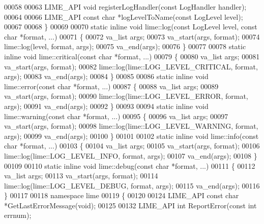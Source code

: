 \begin{DoxyCode}
00058 
00063 LIME_API \textcolor{keywordtype}{void} registerLogHandler(\textcolor{keyword}{const} LogHandler handler);
00064 
00066 LIME_API \textcolor{keyword}{const} \textcolor{keywordtype}{char} *logLevelToName(\textcolor{keyword}{const} LogLevel level);
00067 
00068 \}
00069 
00070 \textcolor{keyword}{static} \textcolor{keyword}{inline} \textcolor{keywordtype}{void} lime::log(\textcolor{keyword}{const} LogLevel level, \textcolor{keyword}{const} \textcolor{keywordtype}{char} *format, ...)
00071 \{
00072     va\_list args;
00073     va\_start(args, format);
00074     lime::log(level, format, args);
00075     va\_end(args);
00076 \}
00077 
00078 \textcolor{keyword}{static} \textcolor{keyword}{inline} \textcolor{keywordtype}{void} lime::critical(\textcolor{keyword}{const} \textcolor{keywordtype}{char} *format, ...)
00079 \{
00080     va\_list args;
00081     va\_start(args, format);
00082     lime::log(lime::LOG_LEVEL_CRITICAL, format, args);
00083     va\_end(args);
00084 \}
00085 
00086 \textcolor{keyword}{static} \textcolor{keyword}{inline} \textcolor{keywordtype}{void} lime::error(\textcolor{keyword}{const} \textcolor{keywordtype}{char} *format, ...)
00087 \{
00088     va\_list args;
00089     va\_start(args, format);
00090     lime::log(lime::LOG_LEVEL_ERROR, format, args);
00091     va\_end(args);
00092 \}
00093 
00094 \textcolor{keyword}{static} \textcolor{keyword}{inline} \textcolor{keywordtype}{void} lime::warning(\textcolor{keyword}{const} \textcolor{keywordtype}{char} *format, ...)
00095 \{
00096     va\_list args;
00097     va\_start(args, format);
00098     lime::log(lime::LOG_LEVEL_WARNING, format, args);
00099     va\_end(args);
00100 \}
00101 
00102 \textcolor{keyword}{static} \textcolor{keyword}{inline} \textcolor{keywordtype}{void} lime::info(\textcolor{keyword}{const} \textcolor{keywordtype}{char} *format, ...)
00103 \{
00104     va\_list args;
00105     va\_start(args, format);
00106     lime::log(lime::LOG_LEVEL_INFO, format, args);
00107     va\_end(args);
00108 \}
00109 
00110 \textcolor{keyword}{static} \textcolor{keyword}{inline} \textcolor{keywordtype}{void} lime::debug(\textcolor{keyword}{const} \textcolor{keywordtype}{char} *format, ...)
00111 \{
00112     va\_list args;
00113     va\_start(args, format);
00114     lime::log(lime::LOG_LEVEL_DEBUG, format, args);
00115     va\_end(args);
00116 \}
00117 
00118 \textcolor{keyword}{namespace }lime
00119 \{
00120 
00124 LIME_API \textcolor{keyword}{const} \textcolor{keywordtype}{char} *GetLastErrorMessage(\textcolor{keywordtype}{void});
00125 
00132 LIME_API \textcolor{keywordtype}{int} ReportError(\textcolor{keyword}{const} \textcolor{keywordtype}{int} errnum);

\end{DoxyCode}
